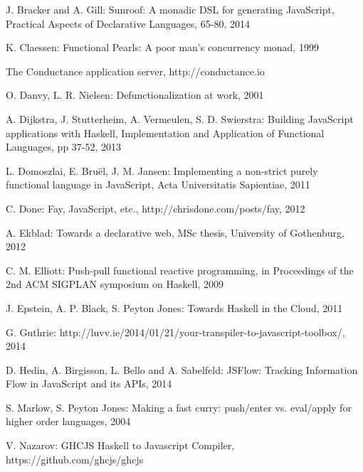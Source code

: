 \documentclass[preprint]{sigplanconf}
\begin{document}
\begin{thebibliography}{}
\softraggedright

J. Bracker and A. Gill: Sunroof: A monadic DSL for generating JavaScript, Practical Aspects of Declarative Languages, 65-80, 2014

K. Claessen: Functional Pearls: A poor man's concurrency monad, 1999

The Conductance application server, http://conductance.io

O. Danvy, L. R. Nielsen: Defunctionalization at work, 2001

A. Dijkstra, J. Stutterheim, A. Vermeulen, S. D. Swierstra: Building JavaScript applications with Haskell, Implementation and Application of Functional Languages, pp 37-52, 2013

L. Domoszlai, E. Bruël, J. M. Jansen: Implementing a non-strict purely functional language in JavaScript, Acta Universitatis Sapientiae, 2011

C. Done: Fay, JavaScript, etc., http://chrisdone.com/posts/fay, 2012

A. Ekblad: Towards a declarative web, MSc thesis, University of Gothenburg, 2012

C. M. Elliott: Push-pull functional reactive programming, in Proceedings of the 2nd ACM SIGPLAN symposium on Haskell, 2009

J. Epstein, A. P. Black, S. Peyton Jones: Towards Haskell in the Cloud, 2011

G. Guthrie: http://luvv.ie/2014/01/21/your-transpiler-to-javascript-toolbox/, 2014

D. Hedin, A. Birgisson, L. Bello and A. Sabelfeld: JSFlow: Tracking Information Flow in JavaScript and its APIs, 2014

S. Marlow, S. Peyton Jones: Making a fast curry: push/enter vs. eval/apply for higher order languages, 2004

V. Nazarov: GHCJS Haskell to Javascript Compiler, https://github.com/ghcjs/ghcjs


\end{thebibliography}
\end{document}
